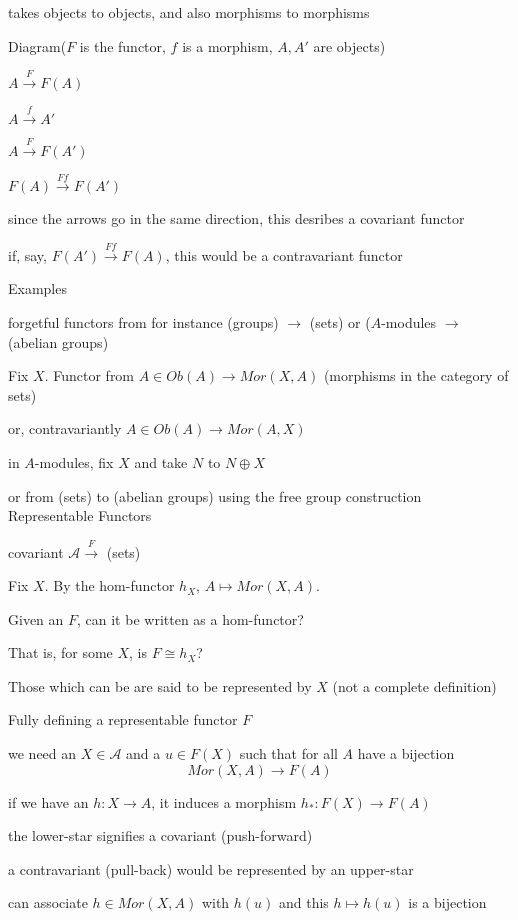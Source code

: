 \documentclass[12pt]{article}
\begin{document}
takes objects to objects, and also morphisms to morphisms

\noindent
Diagram($F$ is the functor, $f$ is a morphism, $A, A'$ are objects)

$A \xrightarrow{F} F(A)$

$A \xrightarrow{f} A'$

$A \xrightarrow{F} F(A')$

$F(A) \xrightarrow{Ff} F(A')$

since the arrows go in the same direction, this desribes a covariant functor

if, say, $F(A') \xrightarrow{Ff} F(A)$, this would be a contravariant functor

\noindent
Examples

forgetful functors from for instance (groups) $\to$ (sets) or ($A$-modules $\to$ (abelian groups)

Fix $X$. Functor from $A \in Ob(A) \to Mor(X, A)$ (morphisms in the category of sets)

or, contravariantly $A \in Ob(A) \to Mor(A, X)$

in $A$-modules, fix $X$ and take $N$ to $N \oplus X$

or from (sets) to (abelian groups) using the free group construction\\

\noindent
Representable Functors

covariant $\mathcal{A} \xrightarrow{F}$ (sets)

Fix $X$.  By the hom-functor $h_X$, $A \mapsto Mor(X, A)$.

Given an $F$, can it be written as a hom-functor?

That is, for some $X$, is $F \cong h_X$?

Those which can be are said to be represented by $X$ (not a complete definition)

\noindent
Fully defining a representable functor $F$

we need an $X \in \mathcal{A}$ and a $u \in F(X)$ such that for all $A$ have a bijection $$Mor(X, A) \to F(A)$$

if we have an $h: X \to A$, it induces a morphism $h_*: F(X) \to F(A)$

the lower-star signifies a covariant (push-forward)

a contravariant (pull-back) would be represented by an upper-star

can associate $h \in Mor(X, A)$ with $h(u)$ and this $h \mapsto h(u)$ is a bijection
\end{document}
